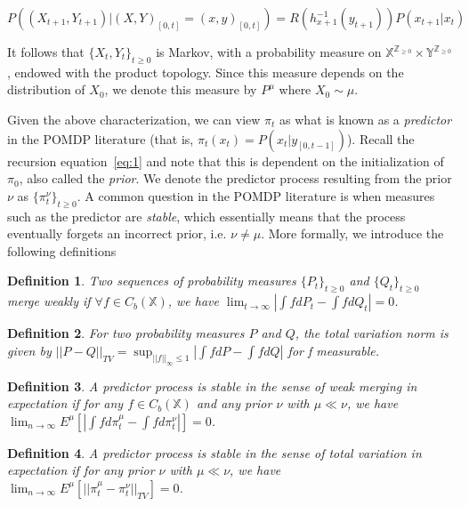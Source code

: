 \documentclass{article}
\newtheorem{definition}{Definition}[section]
\begin{document}
\[ P((X_{t+1},Y_{t+1}) | (X,Y)_{[0,t]} = (x,y)_{[0,t]}) = R(h_{x+1}^{-1}(y_{t+1}))P(x_{t+1} | x_t) \] %

It follows that \( \{X_t,Y_t\}_{t\ge0} \) is Markov, with a probability measure on \( \mathbb{X}^{\mathbb{Z}_{\ge0}} \times \mathbb{Y}^{\mathbb{Z}_{\ge0}} \), endowed with the product topology. Since this measure depends on the distribution of \( X_0 \), we denote this measure by \( P^\mu \) where \( X_0 \sim \mu \). %

Given the above characterization, we can view \( \pi_t \) as what is known as a \emph{predictor} in the POMDP literature (that is, \( \pi_t(x_t) = P(x_t | y_{[0,t-1]}) \)). Recall the recursion equation~\eqref{eq:1} and note that this is dependent on the initialization of \( \pi_0 \), also called the \emph{prior}. We denote the predictor process resulting from the prior \( \nu \) as \( \{\pi_t^\nu \}_{t\ge0} \). A common question in the POMDP literature is when measures such as the predictor are \emph{stable}, which essentially means that the process eventually forgets an incorrect prior, i.e. \( \nu \neq \mu \). More formally, we introduce the following definitions %

\begin{definition}\label{definition:weak_merge}
    Two sequences of probability measures \( \{P_t\}_{t\ge0} \) and \( \{Q_t\}_{t\ge0} \) merge weakly if \( \forall f \in C_b(\mathbb{X}) \), we have \( \lim_{t \to \infty} |\int fdP_t - \int fdQ_t| = 0\). %
\end{definition}

\begin{definition}\label{definition:TV_merge}
    For two probability measures \( P \) and \( Q \), the total variation norm is given by \( ||P-Q||_{TV} = \sup_{||f||_\infty \le 1} |\int fdP - \int fdQ| \) for f measurable.
\end{definition}

\begin{definition}\label{definition:weak_stable}
    A predictor process is stable in the sense of weak merging in expectation if for any \( f \in C_b(\mathbb{X}) \) and any prior \( \nu \) with \( \mu \ll \nu \), we have \( \lim_{n \to \infty}E^\mu [|\int fd\pi_t^\mu - \int fd\pi_t^\nu|] = 0 \). %
\end{definition}

\begin{definition}\label{definition:TV_stable}
    A predictor process is stable in the sense of total variation in expectation if for any prior \( \nu \) with \( \mu \ll \nu \), we have \( \lim_{n \to \infty}E^\mu [||\pi_t^\mu - \pi_t^\nu||_{TV}] = 0 \). %
\end{definition}
\end{document}
